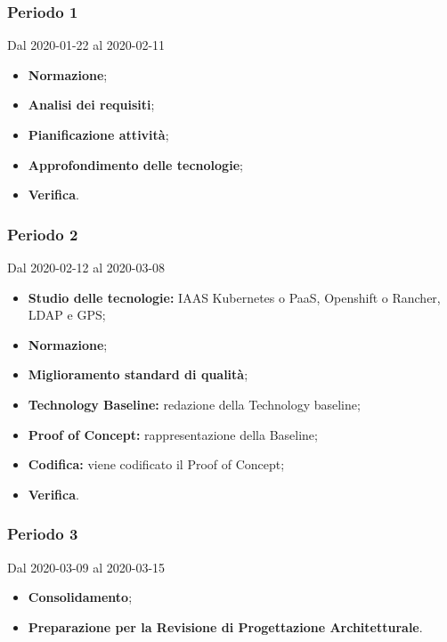 \subsubsection{Periodo 1} 
Dal 2020-01-22 al 2020-02-11
\begin{itemize}
	\item \textbf{Normazione};
	\item \textbf{Analisi dei requisiti};
	\item \textbf{Pianificazione attività};
	\item \textbf{Approfondimento delle tecnologie};
	\item \textbf{Verifica}.
\end{itemize}
\subsubsection{Periodo 2} 
Dal 2020-02-12 al 2020-03-08
\begin{itemize}
	\item \textbf{Studio delle tecnologie:} IAAS Kubernetes o PaaS, Openshift o Rancher, LDAP e GPS;
	\item \textbf{Normazione};
	\item \textbf{Miglioramento standard di qualità};
	\item \textbf{Technology Baseline:} redazione della Technology baseline;
	\item \textbf{Proof of Concept:} rappresentazione della Baseline;
	\item \textbf{Codifica:} viene codificato il Proof of Concept;
	\item \textbf{Verifica}.
\end{itemize}
\subsubsection{Periodo 3} 
Dal 2020-03-09 al 2020-03-15
\begin{itemize}
	\item \textbf{Consolidamento};
	\item \textbf{Preparazione per la Revisione di Progettazione Architetturale}.
\end{itemize}

